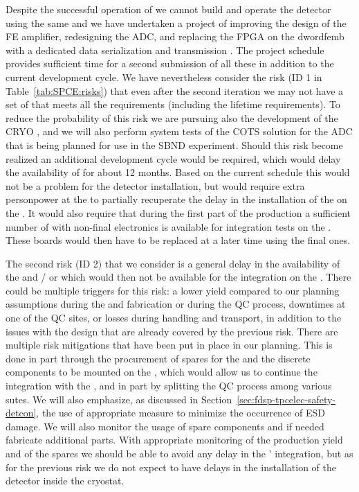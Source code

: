 Despite the successful operation of  we cannot build and operate
the   detector using the same  and we have
undertaken a project of improving the design of the FE amplifier, redesigning
the ADC, and replacing the FPGA on the dword{femb} with a dedicated data
serialization and transmission . The project schedule provides
sufficient time for a second submission of all these  in addition
to the current development cycle. We have nevertheless consider the risk (ID 1
in Table~\ref{tab:SPCE:risks}) that even after the second iteration 
we may not have a set of  that meets all the  requirements
(including the lifetime requirements). To reduce the probability of this 
risk we are pursuing also the development of the CRYO , and we
will also perform system tests of the COTS solution for the ADC that is being
planned for use in the SBND experiment. Should this risk become realized an
additional development cycle would be required, which would delay the availability
of  for about 12 months. Based on the current schedule this would
not be a problem for the detector installation, but would require extra 
personpower at the  to partially recuperate the delay in the
installation of the  on the . It would also require
that during the first part of the  production a sufficient number
of  with non-final electronics is available for integration tests
on the . These boards would then have to be replaced at a later
time using the final ones.

The second risk (ID 2) that we consider is a general delay in the availability of the 
and / or  which would then not be available for the integration
on the . There could be multiple triggers for this risk: a lower yield 
compared to our planning assumptions during the  and  
fabrication or during the QC process, downtimes at one of the QC sites, or losses during 
handling and transport, in addition to the issues with the design that are already 
covered by the previous risk. There are multiple risk mitigations that have been
put in place in our planning. This is done in part through the procurement of
spares for the  and the discrete components to be mounted on the
, which would allow us to continue the integration with the ,
and in part by splitting the QC process among various sutes. We will also emphasize,
as discussed in Section~\ref{sec:fdsp-tpcelec-safety-detcon}, the use of appropriate
measure to minimize the occurrence of ESD damage. We will also monitor the usage
of spare components and if needed fabricate additional parts. With appropriate
monitoring of the production yield and of the spares we should be able to avoid
any delay in the ' integration, but as for the previous risk we
do not expect to have delays in the installation of the detector inside the cryostat.
 
